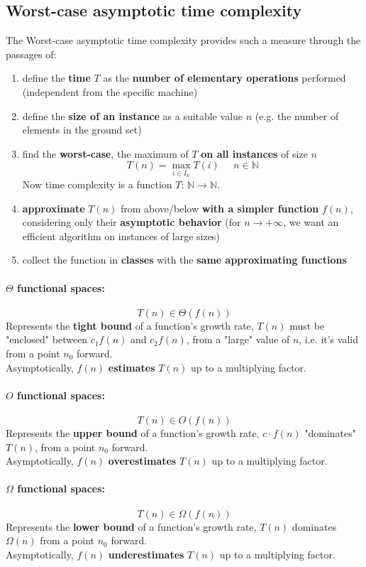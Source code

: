 \subsection{Worst-case asymptotic time complexity}
The Worst-case asymptotic time complexity provides such a measure through the passages of:
\begin{enumerate}
	\item define the \textbf{time} $T$ as the \textbf{number of elementary operations} performed (independent from the specific machine)
	\item define the \textbf{size of an instance} as a suitable value $n$ (e.g. the number of elements in the ground set)
	\item find the \textbf{worst-case}, the maximum of $T$ \textbf{on all instances} of size $n$
	$$ T(n) = \max_{i \in I_n} T(i) \;\;\;\;\; n \in \mathbb{N} $$
	Now time complexity is a function $T : \, \mathbb{N} \rightarrow \mathbb{N}$.
	\item \textbf{approximate} $T(n)$ from above/below \textbf{with a simpler function} $f(n)$, considering only their \textbf{asymptotic behavior} (for $n \rightarrow +\infty$, we want an efficient algorithm on instances of large sizes)
	\item collect the function in \textbf{classes} with the \textbf{same approximating functions}
\end{enumerate}

\paragraph{$\Theta$ functional spaces:}
$$ T(n) \in \Theta(f(n))$$
Represents the \textbf{tight bound} of a function's growth rate, $T(n)$ must be "enclosed" between $c_1 f(n)$ and $c_2 f(n)$, from a "large" value of $n$, i.e. it's valid from a point $n_0$ forward.\\
Asymptotically, $f (n)$ \textbf{estimates} $T (n)$ up to a multiplying factor.

\paragraph{$O$ functional spaces:}
$$ T(n) \in O(f(n))$$
Represents the \textbf{upper bound} of a function's growth rate, $c \cdot f(n)$ "dominates" $T(n)$, from a point $n_0$ forward. \\
Asymptotically, $f (n)$ \textbf{overestimates} $T (n)$ up to a multiplying factor.

\paragraph{$\Omega$ functional spaces:}
$$ T(n) \in \Omega(f(n))$$
Represents the \textbf{lower bound} of a function's growth rate, $T(n)$ dominates $\Omega(n)$ from a point $n_0$ forward. \\
Asymptotically, $f (n)$ \textbf{underestimates} $T (n)$ up to a multiplying factor.

